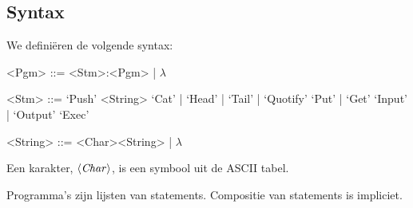 \subsection{Syntax}
\label{sec:def:syn}
We definiëren de volgende syntax:
\setlength{\grammarindent}{5em}
\begin{grammar}
	<Pgm> ::= <Stm>:<Pgm> | $\lambda$ %

	<Stm> ::= `Push' <String>
		\alt `Cat' | `Head' | `Tail' | `Quotify'
		\alt `Put' | `Get'
		\alt `Input' | `Output'
		\alt `Exec'

	<String> ::= <Char><String> | $\lambda$
\end{grammar}

Een karakter, $\langle\mathit{Char}\rangle$, is een symbool uit de ASCII tabel. 

Programma's zijn lijsten van statements. Compositie van statements is
impliciet.

